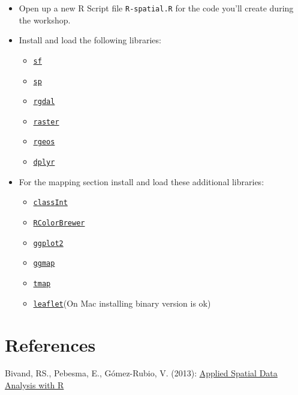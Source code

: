 \documentclass[]{book}
\providecommand{\tightlist}{%
  \setlength{\itemsep}{0pt}\setlength{\parskip}{0pt}}
\begin{document}
\begin{itemize}
\item
  Open up a new R Script file \texttt{R-spatial.R} for the code you'll
  create during the workshop.
\item
  Install and load the following libraries:

  \begin{itemize}
  \tightlist
  \item
    \href{https://cran.r-project.org/package=sf}{\texttt{sf}}
  \item
    \href{https://CRAN.R-project.org/package=sp}{\texttt{sp}}
  \item
    \href{https://CRAN.R-project.org/package=rgdal}{\texttt{rgdal}}
  \item
    \href{https://CRAN.R-project.org/package=raster}{\texttt{raster}}
  \item
    \href{https://CRAN.R-project.org/package=rgeos}{\texttt{rgeos}}
  \item
    \href{https://cran.r-project.org/package=dplyr}{\texttt{dplyr}}
  \end{itemize}
\item
  For the mapping section install and load these additional libraries:

  \begin{itemize}
  \tightlist
  \item
    \href{https://cran.r-project.org/package=classInt}{\texttt{classInt}}
  \item
    \href{https://cran.r-project.org/package=RColorBrewer}{\texttt{RColorBrewer}}
  \item
    \href{https://cran.r-project.org/package=ggplot2}{\texttt{ggplot2}}
  \item
    \href{https://cran.r-project.org/package=ggmap}{\texttt{ggmap}}
  \item
    \href{https://cran.r-project.org/package=tmap}{\texttt{tmap}}
  \item
    \href{https://cran.r-project.org/package=leaflet}{\texttt{leaflet}}(On
    Mac installing binary version is ok)
  \end{itemize}
\end{itemize}

\section*{References}\label{references}

Bivand, RS., Pebesma, E., Gómez-Rubio, V. (2013):
\href{https://link.springer.com/book/10.1007\%2F978-1-4614-7618-4}{Applied
Spatial Data Analysis with R}
\end{document}
